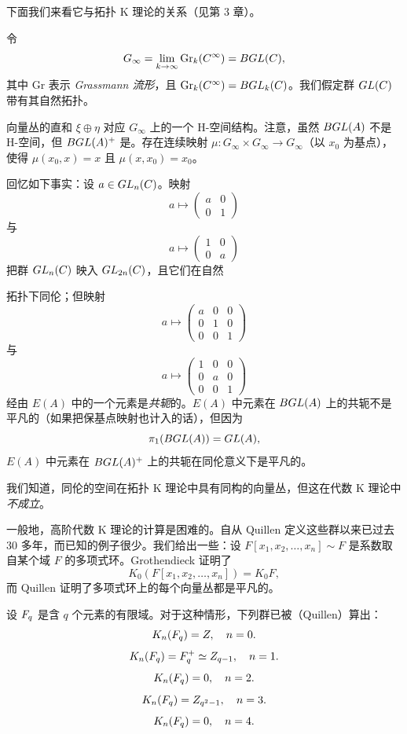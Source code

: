 下面我们来看它与拓扑 K 理论的关系（见第 3 章）。

令
\[ G_\infty=\lim_{k\to\infty}\mathrm{Gr}_k(C^\infty)=BGL(C), \]
其中 $\mathrm{Gr}$ 表示 \emph{Grassmann 流形}，且 $\mathrm{Gr}_k(C^\infty)=BGL_k(C)$。我们假定群 $GL(C)$ 带有其自然拓扑。

向量丛的直和 $\xi\oplus\eta$ 对应 $G_\infty$ 上的一个 H-空间结构。注意，虽然 $BGL(A)$ 不是 H-空间，但 $BGL(A)^+$ 是。存在连续映射 $\mu:G_\infty\times G_\infty\to G_\infty$（以 $x_0$ 为基点），使得 $\mu(x_0,x)=x$ 且 $\mu(x,x_0)=x_0$。

回忆如下事实：设 $a\in GL_n(C)$。映射
\[ a\mapsto\begin{pmatrix} a & 0 \\ 0 & 1 \end{pmatrix} \]
与
\[ a\mapsto\begin{pmatrix} 1 & 0 \\ 0 & a \end{pmatrix} \]
把群 $GL_n(C)$ 映入 $GL_{2n}(C)$，且它们在自然


拓扑下同伦；但映射
\[ a\mapsto\begin{pmatrix} a & 0 & 0 \\ 0 & 1 & 0 \\ 0 & 0 & 1 \end{pmatrix} \]
与
\[ a\mapsto\begin{pmatrix} 1 & 0 & 0 \\ 0 & a & 0 \\ 0 & 0 & 1 \end{pmatrix} \]
经由 $E(A)$ 中的一个元素是\emph{共轭}的。$E(A)$ 中元素在 $BGL(A)$ 上的共轭不是平凡的（如果把保基点映射也计入的话），但因为
\[ \pi_1(BGL(A))=GL(A), \]
$E(A)$ 中元素在 $BGL(A)^+$ 上的共轭在同伦意义下是平凡的。

我们知道，同伦的空间在拓扑 K 理论中具有同构的向量丛，但这在代数 K 理论中\emph{不成立}。

一般地，高阶代数 K 理论的计算是困难的。自从 Quillen 定义这些群以来已过去 30 多年，而已知的例子很少。我们给出一些：设 $F[x_1,x_2,\dots,x_n]\sim F$ 是系数取自某个域 $F$ 的多项式环。Grothendieck 证明了
\[ K_0(F[x_1,x_2,\dots,x_n])=K_0F, \]
而 Quillen 证明了多项式环上的每个向量丛都是平凡的。

设 $F_q$ 是含 $q$ 个元素的有限域。对于这种情形，下列群已被（Quillen）算出：
\[ K_n(F_q)=Z,\quad n=0. \]
\[ K_n(F_q)=F_q^+\simeq Z_{q-1},\quad n=1. \]
\[ K_n(F_q)=0,\quad n=2. \]
\[ K_n(F_q)=Z_{q^2-1},\quad n=3. \]
\[ K_n(F_q)=0,\quad n=4. \]

